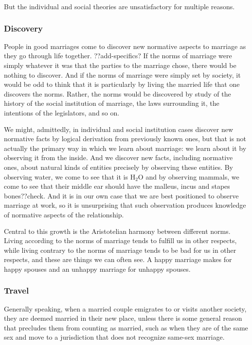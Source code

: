 But the individual and social theories are unsatisfactory for multiple reasons.

\subsubsection{Discovery}
People in good marriages come to discover new normative aspects to marriage as they go through life together. ??add-specifics?
If the norms of marriage were simply whatever it was that the parties to the marriage chose, there would be nothing to discover.
And if the norms of marriage were simply set by society, it would be odd to think that it is particularly by living the married life that
one discovers the norms. Rather, the norms would be discovered by study of the history of the social institution of marriage,
the laws surrounding it, the intentions of the legislators, and so on.

We might, admittedly, in individual and social institution cases discover
new normative facts by logical derivation from previously known ones, but that is not actually the primary way in which we learn about marriage:
we learn about it by observing it from the inside.
And we discover new facts, including normative ones, about natural kinds of entities precisely by observing these entities. By observing water,
we come to see that it is H$_2$O and by observing mammals, we come to see that their middle ear should have the malleus, incus and stapes bones??check. And
it is in our own case that we are best positioned to observe marriage at work, so it is unsurprising that such observation produces knowledge of normative
aspects of the relationship.

Central to this growth is the Aristotelian harmony between different norms. Living according to the norms of marriage tends to fulfill us in other respects,
while living contrary to the norms of marriage tends to be bad for us in other respects, and these are things we can often see. A happy marriage makes for
happy spouses and an unhappy marriage for unhappy spouses.

\subsubsection{Travel}
Generally speaking, when a married couple emigrates to or visits another society, they are deemed married in their new place, unless there is some general reason that
precludes them from counting as married, such as when they are of the same sex and move to a jurisdiction that does not recognize same-sex marriage.

